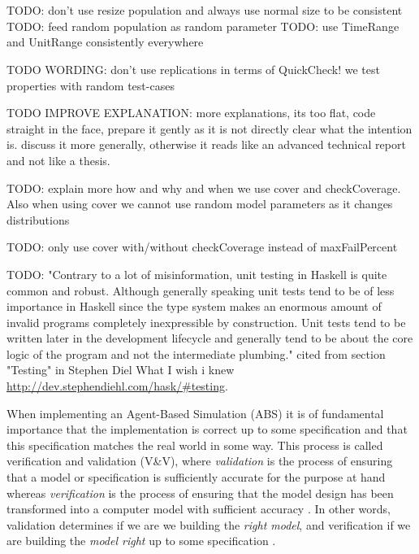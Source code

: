 \chapter*{} %
\label{ch:property}

TODO: don't use resize population and always use normal size to be consistent
TODO: feed random population as random parameter
TODO: use TimeRange and UnitRange consistently everywhere

TODO WORDING: don't use replications in terms of QuickCheck! we test properties with random test-cases

TODO IMPROVE EXPLANATION: more explanations, its too flat, code straight in the face, prepare it gently as it is not directly clear what the intention is. discuss it more generally, otherwise it reads like an advanced technical report and not like a thesis.

TODO: explain more how and why and when we use cover and checkCoverage. Also when using cover we cannot use random model parameters as it changes distributions

TODO: only use cover with/without checkCoverage instead of maxFailPercent

TODO: "Contrary to a lot of misinformation, unit testing in Haskell is quite common and robust. Although generally speaking unit tests tend to be of less importance in Haskell since the type system makes an enormous amount of invalid programs completely inexpressible by construction. Unit tests tend to be written later in the development lifecycle and generally tend to be about the core logic of the program and not the intermediate plumbing." cited from section "Testing" in Stephen Diel What I wish i knew \url{http://dev.stephendiehl.com/hask/#testing}.

When implementing an Agent-Based Simulation (ABS) it is of fundamental importance that the implementation is correct up to some specification and that this specification matches the real world in some way. This process is called verification and validation (V\&V), where \textit{validation} is the process of ensuring that a model or specification is sufficiently accurate for the purpose at hand whereas \textit{verification} is the process of ensuring that the model design has been transformed into a computer model with sufficient accuracy \cite{robinson_simulation:_2014}. In other words, validation determines if we are we building the \textit{right model}, and verification if we are building the \textit{model right} up to some specification \cite{balci_verification_1998}.

